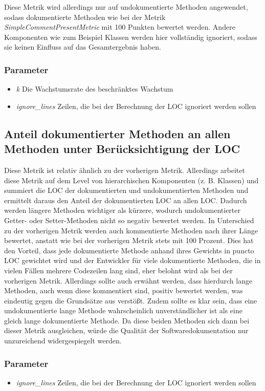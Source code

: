  Diese Metrik wird allerdings nur auf undokumentierte Methoden angewendet, sodass dokumentierte Methoden wie bei der Metrik \textit{SimpleCommentPresentMetric} mit 100 Punkten bewertet werden. Andere Komponenten wie zum Beispiel Klassen werden hier vollständig ignoriert, sodass sie keinen Einfluss auf das Gesamtergebnis haben.
 \subsubsection{Parameter}
 \begin{itemize}
     \item \textit{k} Die Wachstumsrate des beschränktes Wachstum
     \item \textit{ignore\_lines} Zeilen, die bei der Berechnung der \ac{LOC} ignoriert werden sollen
 \end{itemize}
     

 \subsection{Anteil dokumentierter Methoden an allen Methoden unter Berücksichtigung der LOC}\label{chapter:metrics_loc_ratio}
Diese Metrik ist relativ ähnlich zu der vorherigen Metrik. Allerdings arbeitet diese Metrik auf dem Level von hierarchischen Komponenten (z. B. Klassen) und summiert die \ac{LOC} der dokumentierten und undokumentierten Methoden und ermittelt daraus den Anteil der dokumentierten \ac{LOC} an allen \ac{LOC}. Dadurch werden längere Methoden wichtiger als kürzere, wodurch undokumentierter Getter- oder Setter-Methoden nicht so negativ bewertet werden. In Unterschied zu der vorherigen Metrik werden auch kommentierte Methoden nach ihrer Länge bewertet, anstatt wie bei der vorherigen Metrik stets mit 100 Prozent. Dies hat den Vorteil, dass jede dokumentierte Methode anhand ihres Gewichts in puncto \ac{LOC} gewichtet wird und der Entwickler für viele dokumentierte Methoden, die in vielen Fällen mehrere Codezeilen lang sind, eher belohnt wird als bei der vorherigen Metrik. Allerdings sollte auch erwähnt werden, dass hierdurch lange Methoden, auch wenn diese kommentiert sind, positiv bewertet werden, was eindeutig gegen die Grundsätze aus \cite[S. 34]{martin2009clean} verstößt. Zudem sollte es klar sein, dass eine undokumentierte lange Methode wahrscheinlich unverständlicher ist als eine gleich lange dokumentierte Methode. Da diese beiden Methoden sich dann bei dieser Metrik ausgleichen, würde die Qualität der Softwaredokumentation nur unzureichend widergespiegelt werden.
  \subsubsection{Parameter}
  \begin{itemize}
     \item \textit{ignore\_lines} Zeilen, die bei der Berechnung der \ac{LOC} ignoriert werden sollen
 \end{itemize}

